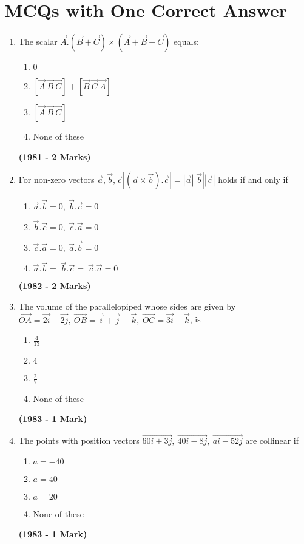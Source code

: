 \documentclass[journal,12pt,twocolumn]{IEEEtran}
\theoremstyle{remark}
\begin{document}
\section{MCQs with One Correct Answer}
\begin{enumerate}
\item The scalar $\vec{A}.(\vec{B}+\vec{C})\times(\vec{A}+\vec{B}+\vec{C})$ equals:\\
\begin{enumerate}[label=(\alph*)]
\item  $0$
\item $[\vec{A}\ \vec{B}\ \vec{C}] + [\vec{B}\ \vec{C}\ \vec{A}]$
\item $[\vec{A}\ \vec{B}\ \vec{C}]$
\item None of these
\end{enumerate}
\hfill{\textbf{(1981 - 2 Marks)}}

\item For non-zero vectors $\vec{a}, \vec{b}, \vec{c} |(\vec{a}\times\vec{b}).\vec{c}| = |\vec{a}||\vec{b}||\vec{c}|$ holds if and only if
\begin{enumerate}[label=(\alph*)]
\item $\vec{a}.\vec{b}=0 ,\ \vec{b}.\vec{c}=0$
\item $\vec{b}.\vec{c}=0 ,\ \vec{c}.\vec{a}=0$
\item $\vec{c}.\vec{a}=0 ,\ \vec{a}.\vec{b}=0$
\item $\vec{a}.\vec{b}=\ \vec{b}.\vec{c}=\ \vec{c}.\vec{a}=0$
\end{enumerate}
\hfill{\textbf{(1982 - 2 Marks)}}

\item The volume of the parallelopiped whose sides are given by $\vec{OA}=\vec{2i}-\vec{2j} ,\ \vec{OB} = \vec{i}+\vec{j}-\vec{k} ,\ \vec{OC}= \vec{3i}-\vec{k}$, is 
\begin{enumerate}[label = (\alph*)]
\item $\frac{4}{13}$
\item $4$
\item $\frac{2}{7}$
\item None of these
\end{enumerate}
\hfill{\textbf{(1983 - 1 Mark)}}

\item The points with position vectors $\vec{60i + 3j},\ \vec{40i-8j},\ \vec{ai-52j}$ are collinear if
\begin{enumerate}[label = (\alph*)]
\item $a=-40$
\item $a=40$
\item $a=20$
\item None of these
\end{enumerate}
\hfill{\textbf{(1983 - 1 Mark)}}


\end{enumerate}
\end{document}
